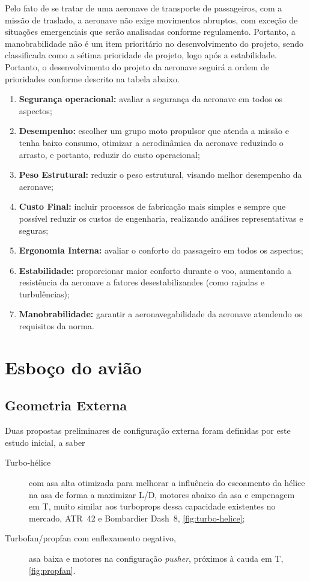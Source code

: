 Pelo fato de se tratar de uma aeronave de transporte de passageiros, com a missão de traslado, a aeronave não exige movimentos abruptos, com exceção de situações emergenciais que serão analisadas conforme regulamento.
Portanto, a manobrabilidade não é um item prioritário no desenvolvimento do projeto, sendo classificada como a sétima prioridade de projeto, logo após a estabilidade.
Portanto, o desenvolvimento do projeto da aeronave seguirá a ordem de prioridades conforme descrito na tabela abaixo. 

\begin{enumerate}
  \item \textbf{Segurança operacional:} avaliar a segurança da aeronave em todos os aspectos;
  \item \textbf{Desempenho:} escolher um grupo moto propulsor que atenda a missão e tenha baixo consumo, otimizar a aerodinâmica da aeronave reduzindo o arrasto, e portanto, reduzir do custo operacional;
  \item \textbf{Peso Estrutural:} reduzir o peso estrutural, visando melhor desempenho da aeronave;
  \item \textbf{Custo Final:} incluir processos de fabricação mais simples e sempre que possível reduzir os custos de engenharia, realizando análises representativas e seguras;
  \item \textbf{Ergonomia Interna:} avaliar o conforto do passageiro em todos os aspectos; 
  \item \textbf{Estabilidade:} proporcionar maior conforto durante o voo, aumentando a resistência da aeronave a fatores desestabilizandes (como rajadas e turbulências);
  \item \textbf{Manobrabilidade:} garantir a aeronavegabilidade da aeronave atendendo os requisitos da norma. 
\end{enumerate}
    
\section{Esboço do avião}
\label{esbocoinicial}
\subsection{Geometria Externa}
Duas propostas preliminares de configuração externa foram definidas por este estudo inicial, a saber 
\begin{description}
\item[Turbo-hélice] com asa alta otimizada para melhorar a influência do escoamento da hélice na asa de forma a maximizar L/D, motores abaixo da asa e empenagem em T, muito similar aos turboprops dessa capacidade existentes no mercado, ATR~42 e Bombardier Dash~8, \autoref{fig:turbo-helice};
\item[Turbofan/propfan com enflexamento negativo,] asa baixa e motores na configuração \emph{pusher}, próximos à cauda em T, \autoref{fig:propfan}.
\end{description}


